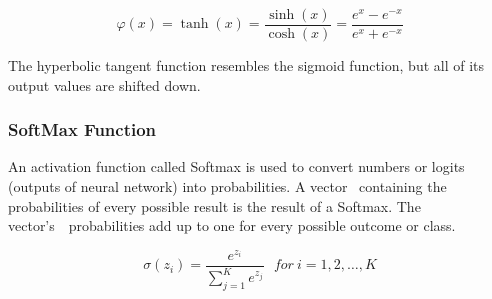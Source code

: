 \begin{equation}
	\varphi(x) = \tanh(x) = \frac{\sinh(x)}{\cosh(x)} = \frac{e^x - e^{-x}}{e^x + e^{-x}}
\end{equation}
\begin{figure}[htp]
	\centering
{}
\end{figure}


The hyperbolic tangent function resembles the sigmoid function, but all of its output values are shifted down.


\subsubsection*{SoftMax Function
}
An activation function called Softmax is used to convert numbers or logits (outputs of neural network) into probabilities. A vector  containing the probabilities of every possible result is the result of a Softmax. The vector's  probabilities add up to one for every possible outcome or class.

\begin{equation}
	\sigma(z_i) = \frac{e^{z_{i}}}{\sum_{j=1}^K e^{z_{j}}} \ \ \ for\ i=1,2,\dots,K
\end{equation}

